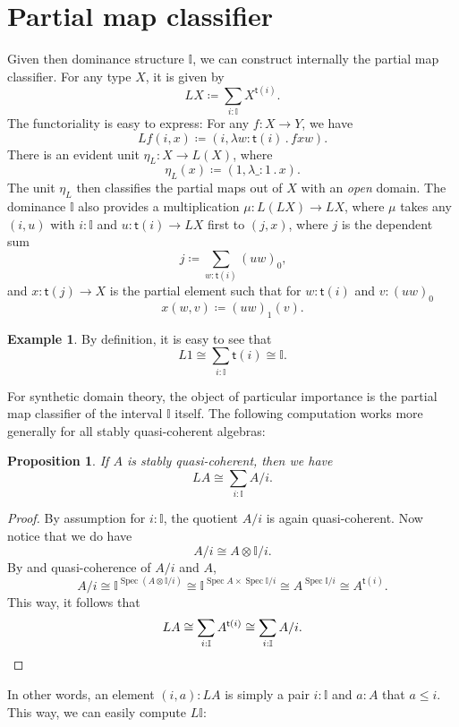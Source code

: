 \documentclass[a4paper,12pt]{amsart}
\newtheorem{proposition}[theorem]{Proposition}
\theoremstyle{definition}
\newtheorem{example}[theorem]{Example}
\newcommand{\mbb}[1]{\mathbb{#1}}
\newcommand{\I}{\mbb I}
\newcommand{\ms}[1]{\mathsf{#1}}
\newcommand{\ld}[2]{\lambda #1\!\colon\!\!#2\mathpunct{.}}
\newcommand{\spec}{\operatorname{Spec}}
\newcommand\istsym{\ms{t}}
\newcommand\ist[1]{\istsym(#1)}
\begin{document}
\section{Partial map classifier}\label{sec:lifting}
Given then dominance structure $\I$, we can construct internally the partial map classifier. For any type $X$, it is given by
\[ L X \coloneq \sum_{i:\I}X^{\ist{i}}\text{.} \]
The functoriality is easy to express: For any $f \colon X \to Y$, we have
\[ L f(i,x) \coloneq (i,\ld{w}{\ist{i}}fxw)\text{.} \]
There is an evident unit $\eta_L \colon X \to L(X)$, where
\[ \eta_L(x) \coloneq (1,\ld\_ 1 x)\text{.} \]
The unit $\eta_L$ then classifies the partial maps out of $X$ with an \emph{open} domain. The dominance $\I$ also provides a multiplication $\mu \colon L(L X) \to L X$, where $\mu$ takes any $(i,u)$ with $i : \I$ and $u \colon \ist{i} \to L X$ first to $(j,x)$, where $j$ is the dependent sum
\[ j \coloneq \sum_{w:\ist{i}} (uw)_0\text{,} \]
and $x \colon \ist{j} \to X$ is the partial element such that for $w : \ist{i}$ and $v : (uw)_0$
\[ x(w,v) \coloneq (uw)_1(v)\text{.} \]

\begin{example}
  By definition, it is easy to see that
  \[ L 1 \cong \sum_{i:\I}\ist{i} \cong \I\text{.} \]
\end{example}

For synthetic domain theory, the object of particular importance is the partial map classifier of the interval $\I$ itself. The following computation works more generally for all stably quasi-coherent algebras:

\begin{proposition}\label{prop:liftingofalgebra}
  If $A$ is stably quasi-coherent, then we have
  \[ L A \cong \sum_{i:\I}A/i\text{.} \]
\end{proposition}
\begin{proof}
  By assumption for $i : \I$, the quotient $A/i$ is again quasi-coherent. Now notice that we do have
  \[ A/i \cong A \otimes \I/i\text{.} \]
  By  and quasi-coherence of $A/i$ and $A$,
  \[ A/i \cong \I^{\spec(A \otimes \I/i)} \cong \I^{\spec A \times \spec\I/i} \cong A^{\spec \I/i} \cong A^{\ist{i}}\text{.} \]
  This way, it follows that 
  \[ L A \cong \sum_{i:\I}A^{\ist{i}} \cong \sum_{i:\I}A/i. \qedhere \]
\end{proof}

In other words, an element $(i,a) : L A$ is simply a pair $i : \I$ and $a : A$ that $a \le i$. This way, we can easily compute $L \I$:
\end{document}
